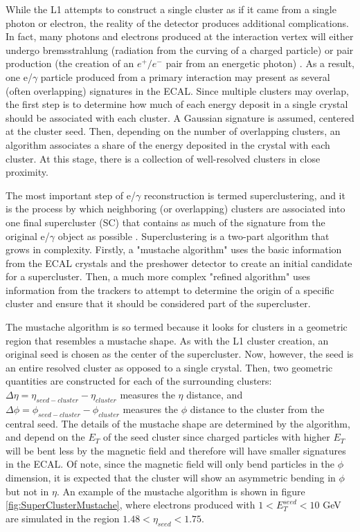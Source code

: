 \documentclass[12pt]{ucsddissertation}
\begin{document}
While the L1 attempts to construct a single cluster as if it came from a single photon or electron, the reality of the detector produces additional complications. In fact, many photons and electrons produced at the interaction vertex will either undergo bremsstrahlung (radiation from the curving of a charged particle) or pair production (the creation of an $e^+/e^-$ pair from an energetic photon) \cite{OfflineReco2021}. As a result, one e/$\gamma$ particle produced from a primary interaction may present as several (often overlapping) signatures in the ECAL. Since multiple clusters may overlap, the first step is to determine how much of each energy deposit in a single crystal should be associated with each cluster. A Gaussian signature is assumed, centered at the cluster seed. Then, depending on the number of overlapping clusters, an algorithm associates a share of the energy deposited in the crystal with each cluster. At this stage, there is a collection of well-resolved clusters in close proximity.

The most important step of e/$\gamma$ reconstruction is termed superclustering, and it is the process by which neighboring (or overlapping) clusters are associated into one final supercluster (SC) that contains as much of the signature from the original e/$\gamma$ object as possible \cite{OfflineReco2021}. Superclustering is a two-part algorithm that grows in complexity. Firstly, a "mustache algorithm" uses the basic information from the ECAL crystals and the preshower detector to create an initial candidate for a supercluster. Then, a much more complex "refined algorithm" uses information from the trackers to attempt to determine the origin of a specific cluster and ensure that it should be considered part of the supercluster.

The mustache algorithm is so termed because it looks for clusters in a geometric region that resembles a mustache shape. As with the L1 cluster creation, an original seed is chosen as the center of the supercluster. Now, however, the seed is an entire resolved cluster as opposed to a single crystal. Then, two geometric quantities are constructed for each of the surrounding clusters: $\Delta \eta = \eta_{seed-cluster} - \eta_{cluster}$ measures the $\eta$ distance, and $\Delta \phi = \phi_{seed-cluster} - \phi_{cluster}$ measures the $\phi$ distance to the cluster from the central seed. The details of the mustache shape are determined by the algorithm, and depend on the $E_T$ of the seed cluster since charged particles with higher $E_T$ will be bent less by the magnetic field and therefore will have smaller signatures in the ECAL. Of note, since the magnetic field will only bend particles in the $\phi$ dimension, it is expected that the cluster will show an asymmetric bending in $\phi$ but not in $\eta$. An example of the mustache algorithm is shown in figure \ref{fig:SuperClusterMustache}, where electrons produced with $1 < E^{seed}_T < 10$ GeV are simulated in the region $1.48 < \eta_{seed} < 1.75$. 
\end{document}
